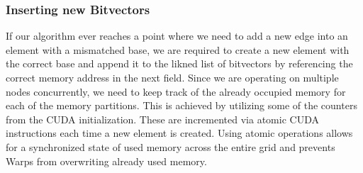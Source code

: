 \subsubsection{Inserting new Bitvectors}
If our algorithm ever reaches a point where we need to add a new edge into an element with a mismatched base, we are required to create a new element with the correct base and append it to the likned list of bitvectors by referencing the correct memory address in the next field.
Since we are operating on multiple nodes concurrently, we need to keep track of the already occupied memory for each of the memory partitions. This is achieved by utilizing some of the counters from the CUDA initialization.
These are incremented via atomic CUDA instructions each time a new element is created.
Using atomic operations allows for a synchronized state of used memory across the entire grid and prevents Warps from overwriting already used memory.

